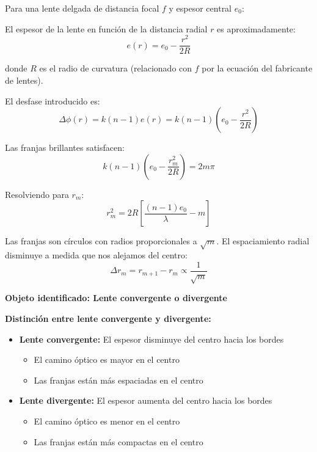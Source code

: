 \documentclass[12pt,a4paper]{article}
\begin{document}
Para una lente delgada de distancia focal $f$ y espesor central $e_0$:

El espesor de la lente en función de la distancia radial $r$ es aproximadamente:
\begin{equation}
    e(r) = e_0 - \frac{r^2}{2R}
\end{equation}

donde $R$ es el radio de curvatura (relacionado con $f$ por la ecuación del fabricante de lentes).

El desfase introducido es:
\begin{equation}
    \Delta\phi(r) = k(n-1)e(r) = k(n-1)\left(e_0 - \frac{r^2}{2R}\right)
\end{equation}

Las franjas brillantes satisfacen:
\begin{equation}
    k(n-1)\left(e_0 - \frac{r_m^2}{2R}\right) = 2m\pi
\end{equation}

Resolviendo para $r_m$:
\begin{equation}
    r_m^2 = 2R\left[\frac{(n-1)e_0}{\lambda} - m\right]
\end{equation}

Las franjas son círculos con radios proporcionales a $\sqrt{m}$. El espaciamiento radial disminuye a medida que nos alejamos del centro:
\begin{equation}
    \Delta r_m = r_{m+1} - r_m \propto \frac{1}{\sqrt{m}}
\end{equation}

\textbf{Objeto identificado: Lente convergente o divergente}

\textbf{Distinción entre lente convergente y divergente:}

\begin{itemize}
    \item \textbf{Lente convergente:} El espesor disminuye del centro hacia los bordes
    \begin{itemize}
        \item El camino óptico es mayor en el centro
        \item Las franjas están más espaciadas en el centro
    \end{itemize}
    
    \item \textbf{Lente divergente:} El espesor aumenta del centro hacia los bordes
    \begin{itemize}
        \item El camino óptico es menor en el centro
        \item Las franjas están más compactas en el centro
    \end{itemize}
\end{itemize}
\end{document}
